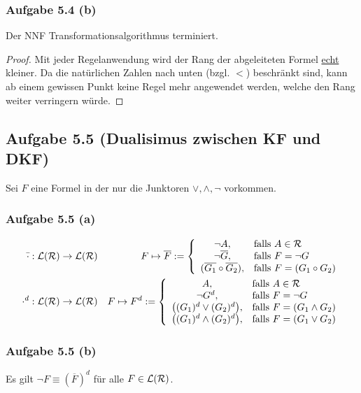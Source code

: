 \subsubsection{Aufgabe 5.4 (b)}
Der NNF Transformationsalgorithmus terminiert.

\begin{proof}
	Mit jeder Regelanwendung wird der Rang der abgeleiteten Formel \underline{echt} kleiner. 
	Da die natürlichen Zahlen nach unten (bzgl. $<$) beschränkt sind, 
	kann ab einem gewissen Punkt keine Regel mehr angewendet werden, welche den Rang weiter verringern würde.
\end{proof}

\subsection{Aufgabe 5.5 (Dualisimus zwischen KF und DKF)}
Sei $F$ eine Formel in der nur die Junktoren $\vee,\wedge,\neg$ vorkommen.

\subsubsection{Aufgabe 5.5 (a)}
\begin{align*}
	\bar{\cdot}&:\mathcal{L}(\mathcal{R})\to\mathcal{L}(\mathcal{R}) &F\mapsto\overline{F}:=\left\lbrace\begin{array}{cl}
		\neg A, &\text{falls } A\in\mathcal{R}\\
		\neg\overline{G}, &\text{falls } F=\neg G\\
		(\overline{G_1}\circ\overline{G_2}), &\text{falls } F=(G_1\circ G_2)
	\end{array}\right.\\
	\cdot^d&:\mathcal{L}(\mathcal{R})\to\mathcal{L}(\mathcal{R}) &F\mapsto F^d:=\left\lbrace\begin{array}{cl}
		A, &\text{falls } A\in\mathcal{R}\\
		\neg G^d, &\text{falls } F=\neg G\\
		\big((G_1)^d\vee(G_2)^d\big), &\text{falls } F=(G_1\wedge G_2)\\
		\big((G_1)^d\wedge(G_2)^d\big), &\text{falls } F=(G_1\vee G_2)
	\end{array}\right.\\
\end{align*}

\subsubsection{Aufgabe 5.5 (b)}
Es gilt $\neg F\equiv(\overline{F})^d$ für alle $F\in\mathcal{L}(\mathcal{R})$.

